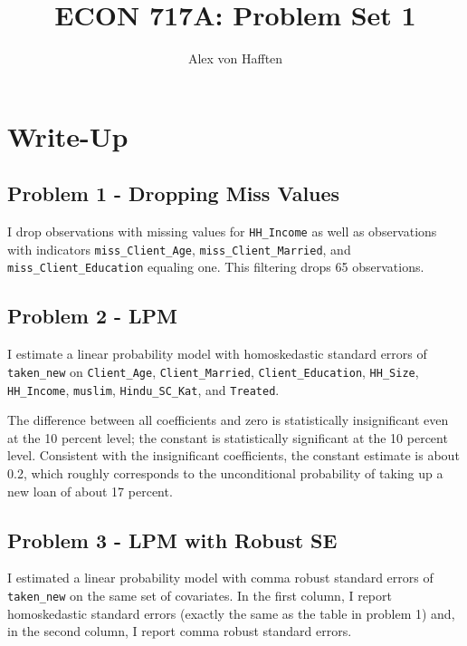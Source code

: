 \documentclass{article}
\title{ECON 717A: Problem Set 1}
\author{Alex von Hafften }
\begin{document}
\maketitle

\section{Write-Up}

\subsection*{Problem 1 - Dropping Miss Values}

I drop observations with missing values for \texttt{HH\_Income} as well as observations with indicators \texttt{miss\_Client\_Age}, \texttt{miss\_Client\_Married}, and \texttt{miss\_Client\_Education} equaling one.  This filtering drops 65 observations.

\subsection*{Problem 2 - LPM}

I estimate a linear probability model with homoskedastic standard errors of \texttt{taken\_new} on \texttt{Client\_Age}, \texttt{Client\_Married}, \texttt{Client\_Education}, \texttt{HH\_Size}, \texttt{HH\_Income}, \texttt{muslim}, \texttt{Hindu\_SC\_Kat}, and \texttt{Treated}.

\bigskip

\begin{center}

\end{center}

\bigskip

The difference between all coefficients and zero is statistically insignificant even at the 10 percent level; the constant is statistically significant at the 10 percent level. Consistent with the insignificant coefficients, the constant estimate is about 0.2, which roughly corresponds to the unconditional probability of taking up a new loan of about 17 percent.

\subsection*{Problem 3 - LPM with Robust SE}

I estimated a linear probability model with comma robust standard errors of \texttt{taken\_new} on the same set of covariates.  In the first column, I report homoskedastic standard errors (exactly the same as the table in problem 1) and, in the second column, I report comma robust standard errors.
\end{document}

